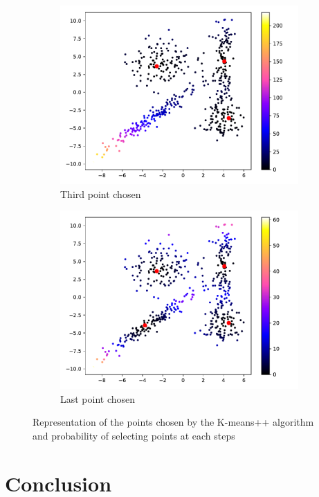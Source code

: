 \documentclass[a4paper, 11pt]{article}
\begin{document}
\begin{figure}[h!]
\begin{subfigure}[t]{0.48\textwidth}
    \includegraphics[width=\textwidth]{Kmeanspp_P2.pdf}
    \caption{Third point chosen}\label{fig:Kmeanspp-p2}
  \end{subfigure}
  \quad
  \begin{subfigure}[t]{0.48\textwidth}
    \centering
    \includegraphics[width=\textwidth]{Kmeanspp_P3.pdf}
    \caption{Last point chosen}\label{fig:Kmeanspp-p3}
  \end{subfigure}
  \caption{Representation of the points chosen by the K-means++
    algorithm and probability of selecting points at each
    steps}\label{fig:Kmeanspp}
\end{figure}

\section{Conclusion}
\end{document}
